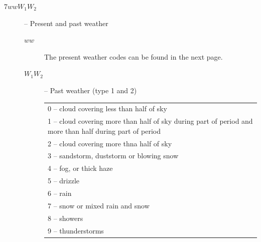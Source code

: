 \documentclass{article}
\begin{document}
\begin{description}
\item[$7wwW_1W_2$] -- Present and past weather
  \begin{description}  
  \item[$ww$] The present weather codes can be found in the next page.

  \item[$W_1W_2$] -- Past weather (type 1 and 2)

    \begin{tabular}{l}
      0 -- cloud covering less than half of sky\\
      1 -- cloud covering more than half of sky during part of period and more than half during part of period\\
      2 -- cloud covering more thna half of sky\\
      3 -- sandstorm, duststorm or blowing snow\\
      4 -- fog, or thick haze\\
      5 -- drizzle\\
      6 -- rain\\
      7 -- snow or mixed rain and snow\\
      8 -- showers\\
      9 -- thunderstorms
    \end{tabular}
    \newpage
    \begin{landscape}


\end{landscape}
\end{description}
\end{description}
\end{document}
